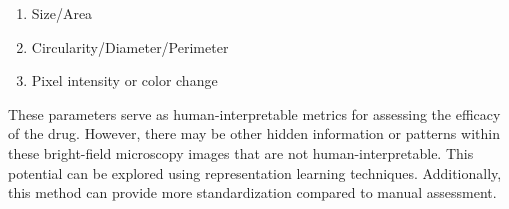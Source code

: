 \begin{enumerate}
  \item Size/Area
  \item Circularity/Diameter/Perimeter
  \item Pixel intensity or color change
\end{enumerate}

These parameters serve as human-interpretable metrics for assessing the efficacy of the drug. However, there may be other hidden information or patterns within these bright-field microscopy images that are not human-interpretable. This potential can be explored using representation learning techniques. Additionally, this method can provide more standardization compared to manual assessment.
\let\cleardoublepage\clearpage
